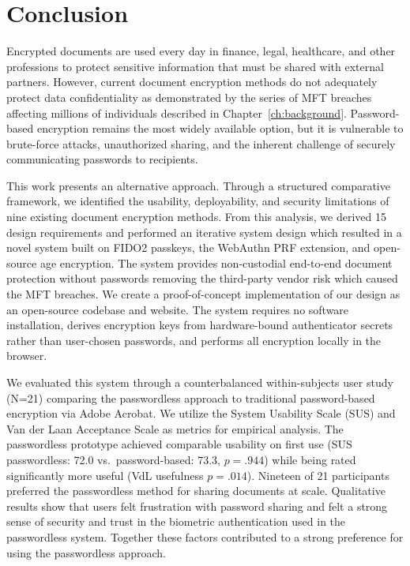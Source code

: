 \section{Conclusion}
\label{sec:conclusion}

Encrypted documents are used every day in finance, legal, healthcare, and other professions to protect sensitive information that must be shared with external partners. However, current document encryption methods do not adequately protect data confidentiality as demonstrated by the series of MFT breaches affecting millions of individuals described in Chapter~\ref{ch:background}. Password-based encryption remains the most widely available option, but it is vulnerable to brute-force attacks, unauthorized sharing, and the inherent challenge of securely communicating passwords to recipients.

This work presents an alternative approach. Through a structured comparative framework, we identified the usability, deployability, and security limitations of nine existing document encryption methods. From this analysis, we derived 15 design requirements and performed an iterative system design which resulted in a novel system built on FIDO2 passkeys, the WebAuthn PRF extension, and open-source age encryption. The system provides non-custodial end-to-end document protection without passwords removing the third-party vendor risk which caused the MFT breaches. We create a proof-of-concept implementation of our design as an open-source codebase and website. The system requires no software installation, derives encryption keys from hardware-bound authenticator secrets rather than user-chosen passwords, and performs all encryption locally in the browser.

We evaluated this system through a counterbalanced within-subjects user study (N=21) comparing the passwordless approach to traditional password-based encryption via Adobe Acrobat. We utilize the System Usability Scale (SUS) and Van der Laan Acceptance Scale as metrics for empirical analysis. The passwordless prototype achieved comparable usability on first use (SUS passwordless: 72.0 vs.\ password-based: 73.3, $p=.944$) while being rated significantly more useful (VdL usefulness $p=.014$). Nineteen of 21 participants preferred the passwordless method for sharing documents at scale. Qualitative results show that users felt frustration with password sharing and felt a strong sense of security and trust in the biometric authentication used in the passwordless system. Together these factors contributed to a strong preference for using the passwordless approach.

